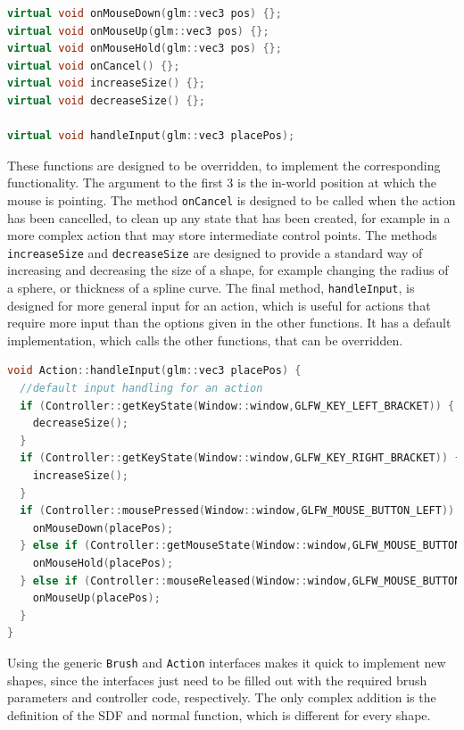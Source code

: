 \documentclass[11pt]{article}
\begin{document}
\begin{lstlisting}[language=C++,label={action_methods},caption={The methods of the \texttt{Action} class responsible for handling user interaction}]
virtual void onMouseDown(glm::vec3 pos) {};
virtual void onMouseUp(glm::vec3 pos) {};
virtual void onMouseHold(glm::vec3 pos) {};
virtual void onCancel() {};
virtual void increaseSize() {};
virtual void decreaseSize() {};

virtual void handleInput(glm::vec3 placePos);
\end{lstlisting}
These functions are designed to be overridden, to implement the corresponding functionality. The argument to the first 3 is the in-world position at which the mouse is pointing. The method \texttt{onCancel} is designed to be called when the action has been cancelled, to clean up any state that has been created, for example in a more complex action that may store intermediate control points. The methods \texttt{increaseSize} and \texttt{decreaseSize} are designed to provide a standard way of increasing and decreasing the size of a shape, for example changing the radius of a sphere, or thickness of a spline curve. The final method, \texttt{handleInput}, is designed for more general input for an action, which is useful for actions that require more input than the options given in the other functions. It has a default implementation, which calls the other functions, that can be overridden.
\begin{lstlisting}[language=C++,label={action_handleinput},caption={Default implementation of \texttt{handleInput}.}]
void Action::handleInput(glm::vec3 placePos) {
  //default input handling for an action
  if (Controller::getKeyState(Window::window,GLFW_KEY_LEFT_BRACKET)) {
    decreaseSize();
  }
  if (Controller::getKeyState(Window::window,GLFW_KEY_RIGHT_BRACKET)) {
    increaseSize();
  }
  if (Controller::mousePressed(Window::window,GLFW_MOUSE_BUTTON_LEFT)) {
    onMouseDown(placePos);
  } else if (Controller::getMouseState(Window::window,GLFW_MOUSE_BUTTON_LEFT)) {
    onMouseHold(placePos);
  } else if (Controller::mouseReleased(Window::window,GLFW_MOUSE_BUTTON_LEFT)) {
    onMouseUp(placePos);
  }
}
\end{lstlisting}

Using the generic \texttt{Brush} and \texttt{Action} interfaces makes it quick to implement new shapes, since the interfaces just need to be filled out with the required brush parameters and controller code, respectively. The only complex addition is the definition of the SDF and normal function, which is different for every shape.
\end{document}
